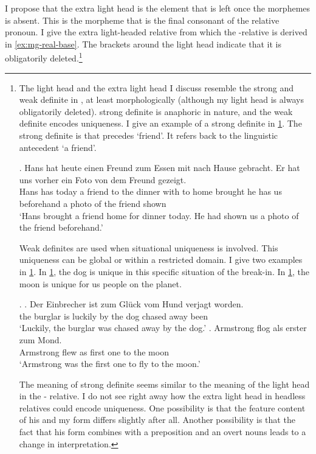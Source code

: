 I propose that the extra light head is the element that is left once the morphemes  is absent. This is the morpheme that is the final consonant of the relative pronoun. I give the extra light-headed relative from which the -relative is derived in \ref{ex:mg-real-base}. The brackets around the light head indicate that it is obligatorily deleted.\footnote{
The light head and the extra light head I discuss resemble the strong and weak definite in \citet{schwarz2009}, at least morphologically (although my light head is always obligatorily deleted).  strong definite is anaphoric in nature, and the weak definite encodes uniqueness. I give an example of a strong definite in \ref{ex:mg-florian-strong}. The strong definite is  that precedes  `friend'. It refers back to the linguistic antecedent  `a friend'.

\exg. Hans hat heute einen Freund zum Essen mit nach Hause gebracht. Er hat uns vorher ein Foto von dem Freund gezeigt.\\
Hans has today a friend {to the} dinner with to home brought he has us beforehand a photo of the friend shown\\
`Hans brought a friend home for dinner today. He had shown us a photo of the friend beforehand.'\label{ex:mg-florian-strong}

Weak definites are used when situational uniqueness is involved. This uniqueness can be global or within a restricted domain. I give two examples in \ref{ex:mg-florian-weak}. In \ref{ex:mg-florian-weak-hund}, the dog is unique in this specific situation of the break-in. In \ref{ex:mg-florian-weak-mond}, the moon is unique for us people on the planet.

\ex.\label{ex:mg-florian-weak}
\ag. Der Einbrecher ist {zum Glück} vom Hund verjagt worden.\\
the burglar is luckily {by the} dog {chased away} been\\
`Luckily, the burglar was chased away by the dog.'\label{ex:mg-florian-weak-hund}
\bg. Armstrong flog als erster zum Mond.\\
Armstrong flew as {first one} {to the} moon\\
`Armstrong was the first one to fly to the moon.' \label{ex:mg-florian-weak-mond}

The meaning of  strong definite seems similar to the meaning of the light head in the - relative.
I do not see right away how the extra light head in headless relatives could encode uniqueness. One possibility is that the feature content of his and my form differs slightly after all. Another possibility is that the fact that his form combines with a preposition and an overt nouns leads to a change in interpretation.
}

